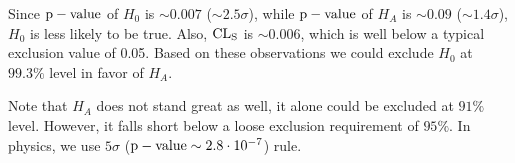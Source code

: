 \documentclass[a4paper]{article}
\begin{document}


Since ${\rm p-value}$ of $H_0$ is $\sim 0.007$ ($\sim 2.5\sigma$), while ${\rm 
p-value}$ of $H_A$ is $\sim 0.09$ ($\sim 1.4\sigma$), $H_0$ is less likely to be 
true. Also, $\rm CL_S$ is $\sim 0.006$, which is well below a typical exclusion 
value of 0.05. Based on these observations we could exclude $H_0$ at $99.3\%$ 
level in favor of $H_A$.

Note that $H_A$ does not stand great as well, it alone could be excluded at
$91\%$ level. However, it falls short below a loose exclusion
requirement of $95\%$. In physics, we use $5\sigma$ (${\rm p-value} \sim 2.8 
\cdot 10^{-7}$) rule.
\end{document}
